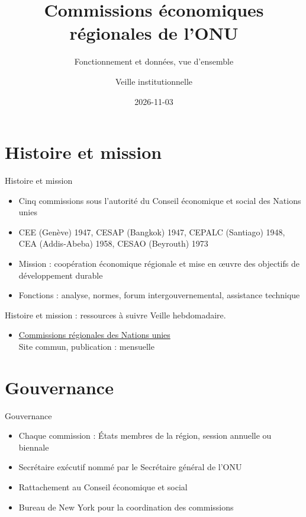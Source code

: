 \documentclass[aspectratio=169,11pt]{beamer}
\title{Commissions économiques régionales de l'ONU}
\subtitle{Fonctionnement et données, vue d'ensemble}
\author{Veille institutionnelle}
\date{2026-11-03}
\begin{document}
\begin{frame}\titlepage\end{frame}

\section{Histoire et mission}
\begin{frame}{Histoire et mission}
\begin{itemize}
\item Cinq commissions sous l'autorité du Conseil économique et social des Nations unies
\item CEE (Genève) 1947, CESAP (Bangkok) 1947, CEPALC (Santiago) 1948, CEA (Addis-Abeba) 1958, CESAO (Beyrouth) 1973
\item Mission : coopération économique régionale et mise en œuvre des objectifs de développement durable
\item Fonctions : analyse, normes, forum intergouvernemental, assistance technique
\end{itemize}
\end{frame}

\begin{frame}{Histoire et mission : ressources à suivre}
\small
Veille hebdomadaire.
\begin{itemize}
\item \href{https://www.regionalcommissions.org}{Commissions régionales des Nations unies}\\{\footnotesize Site commun, publication : mensuelle}
\end{itemize}
\end{frame}

\section{Gouvernance}
\begin{frame}{Gouvernance}
\begin{itemize}
\item Chaque commission : États membres de la région, session annuelle ou biennale
\item Secrétaire exécutif nommé par le Secrétaire général de l'ONU
\item Rattachement au Conseil économique et social
\item Bureau de New York pour la coordination des commissions
\end{itemize}
\end{frame}
\end{document}

